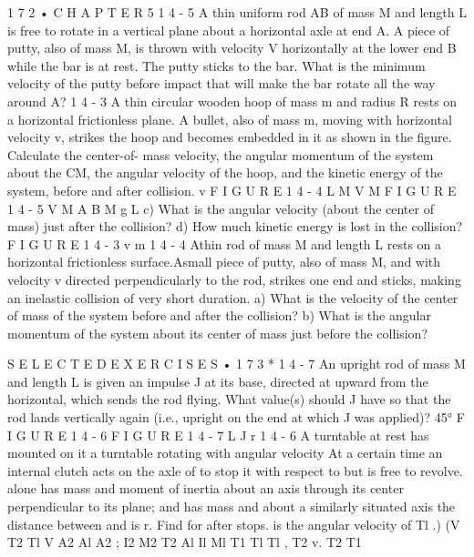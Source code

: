 \documentclass[10pt,oneside]{article}
\begin{document}
1 7 2 • C H A P T E R  5 \emph{ } 1 4 - 5 A thin uniform rod AB of mass M and length L is free to rotate in a vertical plane about a horizontal axle at end A. A piece of putty, also of mass M, is thrown with velocity V horizontally at the lower end B while the bar is at rest. The putty sticks to the bar. What is the minimum velocity of the putty before impact that will make the bar rotate all the way around A? \emph{ } 1 4 - 3 A thin circular wooden hoop of mass m and radius R rests on a horizontal frictionless plane. A bullet, also of mass m, moving with horizontal velocity v, strikes the hoop and becomes embedded in it as shown in the figure. Calculate the center-of- mass velocity, the angular momentum of the system about the CM, the angular velocity of the hoop, and the kinetic energy of the system, before and after collision. v F I G U R E  1 4 - 4 L M V M F I G U R E  1 4 - 5 V M A B M g L c) What is the angular velocity (about the center of mass) just after the collision? d) How much kinetic energy is lost in the collision? F I G U R E  1 4 - 3 v m \emph{ } 1 4 - 4 Athin rod of mass M and length L rests on a horizontal frictionless surface.Asmall piece of putty, also of mass M, and with velocity v directed perpendicularly to the rod, strikes one end and sticks, making an inelastic collision of very short duration. a) What is the velocity of the center of mass of the system before and after the collision? b) What is the angular momentum of the system about its center of mass just before the collision?\par

S E L E C T E D  E X E R C I S E S • 1 7 3 \emph{ } * 1 4 - 7 An upright rod of mass M and length L is given an impulse J at its base, directed at upward from the horizontal, which sends the rod flying. What value(s) should J have so that the rod lands vertically again (i.e., upright on the end at which J was applied)? 45° F I G U R E  1 4 - 6 F I G U R E  1 4 - 7 L J r \emph{ } 1 4 - 6 A turntable at rest has mounted on it a turntable rotating with angular velocity At a certain time an internal clutch acts on the axle of to stop it with respect to but is free to revolve. alone has mass and moment of inertia about an axis through its center perpendicular to its plane; and has mass and about a similarly situated axis the distance between and is r. Find for after stops. is the angular velocity of Tl .) (V T2 Tl V A2 Al A2 ; I2 M2 T2 Al Il Ml T1 Tl Tl , T2 v. T2 T1\par
\end{document}
